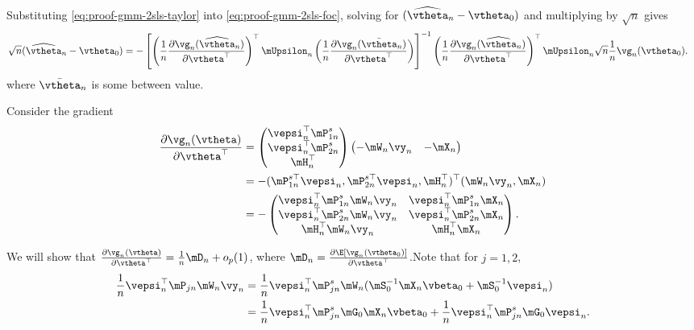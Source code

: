   
  Substituting \eqref{eq:proof-gmm-2sls-taylor} into \eqref{eq:proof-gmm-2sls-foc}, solving for $(\widehat{\vtheta}_n - \vtheta_0)$ and multiplying by $\sqrt{n}$ gives
  \begin{equation*}
  \begin{aligned}
   \sqrt{n}(\widehat{\vtheta}_n - \vtheta_0) & = -\left[\left(\frac{1}{n}\frac{\partial \vg_n(\widehat{\vtheta}_n)}{\partial \vtheta^\top}\right)^\top\mUpsilon_n\left(\frac{1}{n}\frac{\partial \vg_n(\bar{\vtheta}_n)}{\partial \vtheta^\top}\right)\right]^{-1}\left(\frac{1}{n}\frac{\partial \vg_n(\widehat{\vtheta}_n)}{\partial \vtheta^\top}\right)^\top\mUpsilon_n\sqrt{n}\frac{1}{n}\vg_n(\vtheta_0).
   \end{aligned}
  \end{equation*}
  where $\bar{\vtheta}_n$ is some between value. 
  
  Consider the gradient
  \begin{equation*}
  \begin{aligned}
  \frac{\partial \vg_n(\vtheta)}{\partial \vtheta ^\top} & = 
  \begin{pmatrix}
    \vepsi_n^\top\mP_{1n}^s \\
    \vepsi_n^\top\mP_{2n}^s \\
    \mH_n^\top
    \end{pmatrix}
  \begin{pmatrix}
    -\mW_n\vy_n & -\mX_n
  \end{pmatrix} \\
  & =  - (\mP_{1n}^{s\top} \vepsi_n, \mP_{2n}^{s\top}\vepsi_n, \mH_n^\top)^\top(\mW_n\vy_n, \mX_n) \\
  & = - \begin{pmatrix}
  \vepsi_n^\top\mP_{1n}^s\mW_n\vy_n & \vepsi_n^\top\mP_{1n}^s\mX_n \\
  \vepsi_n^\top\mP_{2n}^s\mW_n\vy_n & \vepsi_n^\top\mP_{2n}^s\mX_n \\
  \mH_n^\top\mW_n\vy_n & \mH_n^\top\mX_n
      \end{pmatrix}.
  \end{aligned}
  \end{equation*}
  
  We will show that $\frac{\partial \vg_n(\vtheta)}{\partial \vtheta ^\top} = \frac{1}{n}\mD_n + o_p(1)$, where $\mD_n = \frac{\partial \E\left[\vg_n(\vtheta_0)\right]}{\partial \vtheta^\top}$.Note that for $j = 1, 2$, 
  \begin{equation*}
  \begin{aligned}
  \frac{1}{n}\vepsi_n^\top \mP_{jn}\mW_n\vy_n  & = \frac{1}{n}\vepsi_n^\top \mP_{jn}^s\mW_n(\mS_0^{-1}\mX_n\vbeta_0 + \mS_0^{-1}\vepsi_n) \\
  & =\frac{1}{n}\vepsi_n^\top \mP_{jn}^s\mG_0\mX_n\vbeta_0 + \frac{1}{n}\vepsi_n^\top\mP_{jn}^s\mG_0\vepsi_n.
  \end{aligned}
  \end{equation*}
  
